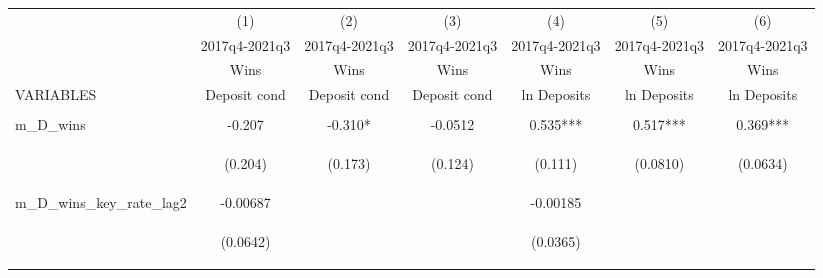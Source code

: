 \documentclass[]{article}
\begin{document}
\begin{center}
\begin{tabular}{lcccccc} \hline
 & (1) & (2) & (3) & (4) & (5) & (6) \\
 & 2017q4-2021q3 & 2017q4-2021q3 & 2017q4-2021q3 & 2017q4-2021q3 & 2017q4-2021q3 & 2017q4-2021q3 \\
 & Wins & Wins & Wins & Wins & Wins & Wins \\
VARIABLES & Deposit cond & Deposit cond & Deposit cond & ln Deposits & ln Deposits & ln Deposits \\ \hline
\vspace{4pt} & \begin{footnotesize}\end{footnotesize} & \begin{footnotesize}\end{footnotesize} & \begin{footnotesize}\end{footnotesize} & \begin{footnotesize}\end{footnotesize} & \begin{footnotesize}\end{footnotesize} & \begin{footnotesize}\end{footnotesize} \\
m\_D\_wins & -0.207 & -0.310* & -0.0512 & 0.535*** & 0.517*** & 0.369*** \\
\vspace{4pt} & \begin{footnotesize}(0.204)\end{footnotesize} & \begin{footnotesize}(0.173)\end{footnotesize} & \begin{footnotesize}(0.124)\end{footnotesize} & \begin{footnotesize}(0.111)\end{footnotesize} & \begin{footnotesize}(0.0810)\end{footnotesize} & \begin{footnotesize}(0.0634)\end{footnotesize} \\
m\_D\_wins\_key\_rate\_lag2 & -0.00687 &  &  & -0.00185 &  &  \\
\vspace{4pt} & \begin{footnotesize}(0.0642)\end{footnotesize} & \begin{footnotesize}\end{footnotesize} & \begin{footnotesize}\end{footnotesize} & \begin{footnotesize}(0.0365)\end{footnotesize} & \begin{footnotesize}\end{footnotesize} & \begin{footnotesize}\end{footnotesize} \\

\end{tabular}
\end{center}
\end{document}
